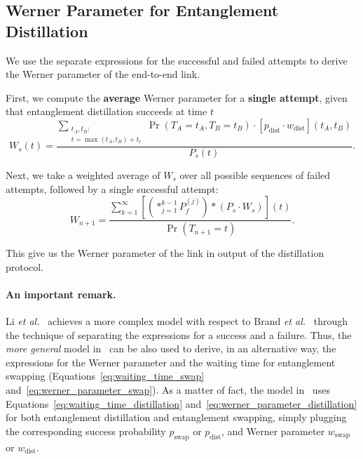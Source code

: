 \documentclass{masterthesis}
\begin{document}
\subsection{Werner Parameter for Entanglement Distillation}

We use the separate expressions for the successful and failed attempts to derive the Werner parameter of the end-to-end link. 

First, we compute the \textbf{average} Werner parameter for a \textbf{single attempt}, given that entanglement distillation succeeds at time $t$
\begin{equation}
    W_s(t) = \frac{\sum_{\substack{t_A, t_B : \\ t = \max(t_A, t_B) + t_c}} \Pr(T_A = t_A, T_B = t_B) \cdot [p_\text{dist} \cdot w_\text{dist}](t_A, t_B)}{P_s(t)} .
\end{equation}

Next, we take a weighted average of $W_s$ over all possible sequences of failed attempts, followed by a single successful attempt:
\begin{equation}\label{eq:werner_parameter_distillation}
    W_{n+1} = \frac{\sum_{k=1}^{\infty} \left[ \left( \ast_{j=1}^{k-1} P_f^{(j)} \right) \ast (P_s \cdot W_s) \right] (t)}{\Pr(T_{n+1} = t)}.
\end{equation}

This give us the Werner parameter of the link in output of the distillation protocol.

\paragraph*{An important remark.} Li \textit{et al.}~\cite{Li_2021} achieves a more complex model with respect to Brand \textit{et al.}~\cite{Brand_2020} through the technique of separating the expressions for a success and a failure. Thus, the \textit{more general} model in~\cite{Li_2021} can be also used to derive, in an alternative way, the expressions for the Werner parameter and the waiting time for entanglement swapping (Equations~\ref{eq:waiting_time_swap} and~\ref{eq:werner_parameter_swap}).
As a matter of fact, the model in~\cite{Li_2021} uses Equations~\ref{eq:waiting_time_distillation} and~\ref{eq:werner_parameter_distillation} for both entanglement distillation and entanglement swapping, simply plugging the corresponding success probability $p_\text{swap}$ or $p_\text{dist}$, and Werner parameter $w_\text{swap}$ or $w_\text{dist}$.
\end{document}
